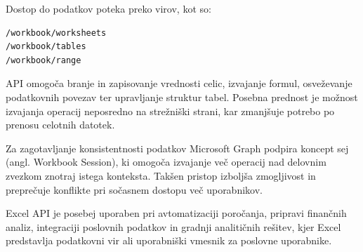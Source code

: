 \documentclass[a4paper, 12pt]{book}
\begin{document}
Dostop do podatkov poteka preko virov, kot so:

\begin{verbatim}
/workbook/worksheets
/workbook/tables
/workbook/range
\end{verbatim}

API omogoča branje in zapisovanje vrednosti celic, izvajanje formul, osveževanje podatkovnih povezav ter upravljanje struktur tabel.
Posebna prednost je možnost izvajanja operacij neposredno na strežniški strani, kar zmanjšuje potrebo po prenosu celotnih datotek.

Za zagotavljanje konsistentnosti podatkov Microsoft Graph podpira koncept sej (angl. Workbook Session), ki omogoča izvajanje več operacij nad delovnim zvezkom znotraj istega konteksta. Takšen pristop izboljša zmogljivost in preprečuje konflikte pri sočasnem dostopu več uporabnikov.

Excel API je posebej uporaben pri avtomatizaciji poročanja, pripravi finančnih analiz, integraciji poslovnih podatkov in gradnji analitičnih rešitev, kjer Excel predstavlja podatkovni vir ali uporabniški vmesnik za poslovne uporabnike.
\end{document}

